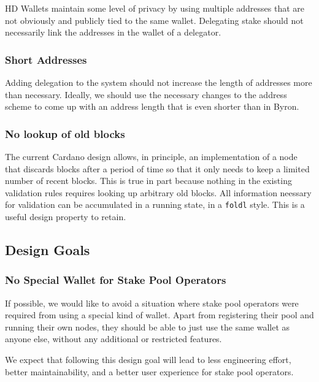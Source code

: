 \documentclass[11pt,a4paper]{article}
\begin{document}
HD Wallets maintain some level of privacy by using multiple addresses
that are not obviously and publicly tied to the same wallet. Delegating
stake should not necessarily link the addresses in the wallet of a
delegator.

\subsubsection{Short Addresses}
\label{short-addresses}

Adding delegation to the system should not increase the length of
addresses more than necessary. Ideally, we should use the necessary
changes to the address scheme to come up with an address length that is
even shorter than in Byron.

\subsubsection{No lookup of old blocks}
\label{no-lookup-of-old-blocks}

The current Cardano design allows, in principle, an implementation of a
node that discards blocks after a period of time so that it only needs
to keep a limited number of recent blocks. This is true in part because
nothing in the existing validation rules requires looking up arbitrary
old blocks. All information neessary for validation can be accumulated
in a running state, in a \texttt{foldl} style. This is a useful design
property to retain.

\subsection{Design Goals}
\label{design-goals}

\subsubsection{No Special Wallet for Stake Pool Operators}
\label{no-special-wallet-for-stake-pool-operators}

If possible, we would like to avoid a situation where stake pool
operators were required from using a special kind of wallet. Apart from
registering their pool and running their own nodes, they should be able
to just use the same wallet as anyone else, without any additional or
restricted features.

We expect that following this design goal will lead to less engineering
effort, better maintainability, and a better user experience for stake
pool operators.
\end{document}
